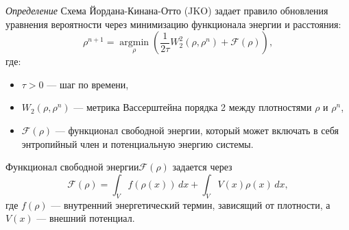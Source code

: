 \textit{Определение}  Схема Йордана-Кинана-Отто (JKO) задает правило обновления уравнения вероятности через
минимизацию функционала  энергии и расстояния:
\begin{equation}
    \rho^{n+1} = \underset{\rho}{\operatorname{argmin}} \left( \frac{1}{2\tau} W_2^2(\rho, \rho^n) + \mathcal{F}(\rho) \right),
\end{equation}
где:\begin{itemize}
    \item \(\tau > 0\) — шаг по времени,
    \item \(W_2(\rho, \rho^n)\) — метрика Вассерштейна порядка 2 между плотностями \(\rho\) и \(\rho^n\),
    \item  \(\mathcal{F}(\rho)\) — функционал свободной энергии, который может включать в себя энтропийный член и потенциальную энергию системы.
\end{itemize}
Функционал свободной энергии\(\mathcal{F}(\rho)\) задается через
\begin{equation}
    \mathcal{F}(\rho) = \int_V f(\rho(x)) \, dx + \int_V V(x) \rho(x) \, dx,
\end{equation}
где \(f(\rho)\) — внутренний энергетический термин, зависящий от плотности, а \(V(x)\) — внешний потенциал.



